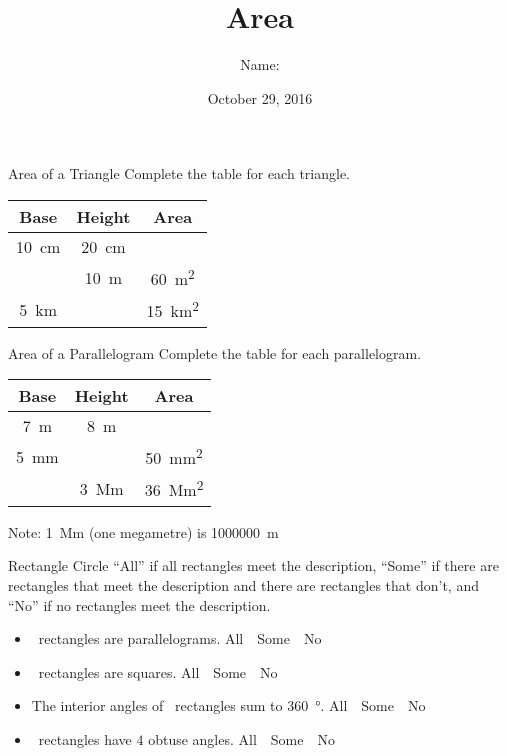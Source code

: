 \documentclass[14pt,letterpaper]{article}
\title{Area}
\author{Name: \underline{\hspace{5cm}}}
\date{October 29, 2016}
\begin{document}
\HomeworkTitle

\thispagestyle{empty}

\begin{problem}{Area of a Triangle}
 Complete the table for each triangle.

 \begin{center}
 \begin{tabular}{|c|c|c|}
  \hline
  Base & Height & Area \\
  \hline
  \SI{10}{\centi\metre} & \SI{20}{\centi\metre} & \\
  & \SI{10}{\metre} & \SI{60}{\metre\squared} \\
  \SI{5}{\kilo\metre} & & \SI{15}{\kilo\metre\squared} \\
  \hline
 \end{tabular}
 \end{center}
\end{problem}

\begin{problem}{Area of a Parallelogram}
 Complete the table for each parallelogram.

 \begin{center}
 \begin{tabular}{|c|c|c|}
  \hline
  Base & Height & Area \\
  \hline
  \SI{7}{\metre} & \SI{8}{\metre} & \\
  \SI{5}{\milli\metre} & & \SI{50}{\milli\metre\squared} \\
  & \SI{3}{\mega\metre} & \SI{36}{\mega\metre\squared} \\
  \hline
 \end{tabular}
 \end{center}
 Note: \SI{1}{\mega\metre} (one megametre) is \SI{1000000}{\metre}
\end{problem}

\begin{problem}{Rectangle}
 Circle ``All'' if all rectangles meet the description, ``Some'' if there are
 rectangles that meet the description and there are rectangles that don't, and
 ``No'' if no rectangles meet the description.

 \begin{itemize}
  \item \blankC~rectangles are parallelograms. \hfill All~~Some~~No
  \item \blankC~rectangles are squares. \hfill All~~Some~~No
  \item The interior angles of \blankC~rectangles sum to \SI{360}{\degree}.
  \hfill All~~Some~~No
  \item \blankC~rectangles have $4$ obtuse angles. \hfill All~~Some~~No
 \end{itemize}
\end{problem}
\end{document}
